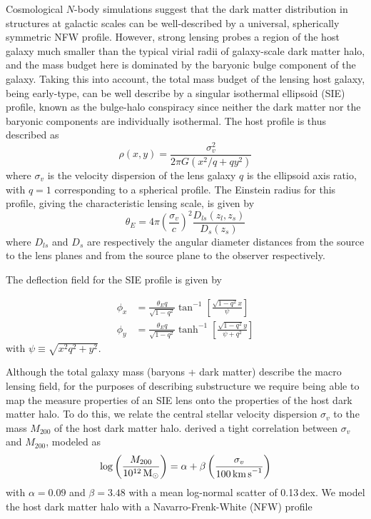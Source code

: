 \documentclass[twocolumn]{aastex62}
\newcommand{\Msun}{\textrm{M}_\odot}
\newcommand{\kmps}{\textrm{km\,s}^{-1}}
\begin{document}
Cosmological $N$-body simulations suggest that the dark matter distribution in structures at galactic scales can be well-described by a universal, spherically symmetric NFW profile. However, strong lensing probes a region of the host galaxy much smaller than the typical virial radii of galaxy-scale dark matter halo, and the mass budget here is dominated by the baryonic bulge component of the galaxy. Taking this into account, the total mass budget of the lensing host galaxy, being early-type, can be well describe by a singular isothermal ellipsoid (SIE) profile, known as the bulge-halo conspiracy since neither the dark matter nor the baryonic components are individually isothermal. The host profile is thus described as
\begin{equation}
\rho(x, y)=\frac{\sigma_{v}^{2}}{2 \pi G\left(x^{2} / q+q y^{2}\right)}
\end{equation}
where $\sigma_{v}$ is the velocity dispersion of the lens galaxy $q$ is the ellipsoid axis ratio, with $q=1$ corresponding to a spherical profile. The Einstein radius for this profile, giving the characteristic lensing scale, is given by
\begin{equation}
\theta_{{E}}=4 \pi\left(\frac{\sigma_{v}}{c}\right)^{2} \frac{D_{l s}\left(z_{l}, z_{s}\right)}{D_{s}\left(z_{s}\right)}
\end{equation}
where $D_{ls}$ and $D_s$ are respectively the angular diameter distances from the source to the lens planes and from the source plane to the observer respectively. 

The deflection field for the SIE profile is given by~\citep{2001astro.ph..2341K}

\begin{align} 
\phi_{x} &=\frac{\theta_E q}{\sqrt{1-q^{2}}} \tan ^{-1}\left[\frac{\sqrt{1-q^{2}} x}{\psi}\right] \\ 
\phi_{y} &=\frac{\theta_E q}{\sqrt{1-q^{2}}} \tanh ^{-1}\left[\frac{\sqrt{1-q^{2}} y}{\psi+q^{2} }\right] 
\end{align}
with $\psi \equiv \sqrt{x^2 q^2 + y^2}$.

Although the total galaxy mass (baryons + dark matter) describe the macro lensing field, for the purposes of describing substructure we require being able to map the measure properties of an SIE lens onto the properties of the host dark matter halo. To do this, we relate the central stellar velocity dispersion $\sigma_v$ to the mass $M_{200}$ of the host dark matter halo. \citet{2018ApJ...859...96Z} derived a tight correlation between $\sigma_v$ and $M_{200}$, modeled as
\begin{equation}
\log\left(\frac{M_{200}}{10^{12}\,\Msun}\right) = \alpha + \beta\left(\frac{\sigma_v}{100\,\kmps}\right)
\end{equation}
with $\alpha = 0.09$ and $\beta = 3.48$ with a mean log-normal scatter of 0.13\,dex. We model the host dark matter halo with a Navarro-Frenk-White (NFW) profile~\citep{1996ApJ...462..563N,1997ApJ...490..493N}
\end{document}
